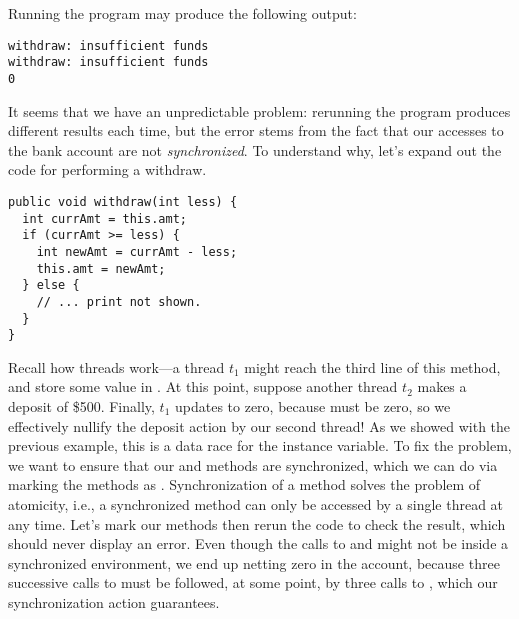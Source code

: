 Running the program may produce the following output:

\par{
\begin{verbatim}
withdraw: insufficient funds
withdraw: insufficient funds
0
\end{verbatim}
}

It seems that we have an unpredictable problem: rerunning the program produces different results each time, but the error stems from the fact that our accesses to the bank account are not \textit{synchronized}. To understand why, let's expand out the code for performing a withdraw.

\par{
\begin{verbatim}
public void withdraw(int less) {
  int currAmt = this.amt;
  if (currAmt >= less) {
    int newAmt = currAmt - less;
    this.amt = newAmt;
  } else {
    // ... print not shown.
  }
}
\end{verbatim}
}

\begin{sloppypar}{Recall how threads work---a thread $t_1$ might reach the third line of this method, and store some value in . At this point, suppose another thread $t_2$ makes a deposit of \$500. Finally, $t_1$ updates  to zero, because  must be zero, so we effectively nullify the deposit action by our second thread! As we showed with the previous example, this is a data race for the  instance variable. To fix the problem, we want to ensure that our  and  methods are synchronized, which we can do via marking the methods as . Synchronization of a method solves the problem of atomicity, i.e., a synchronized method can only be accessed by a single thread at any time. Let's mark our methods then rerun the code to check the result, which should never display an error. Even though the calls to  and  might not be inside a synchronized environment, we end up netting zero in the account, because three successive calls to  must be followed, at some point, by three calls to , which our synchronization action guarantees.}
\end{sloppypar}


